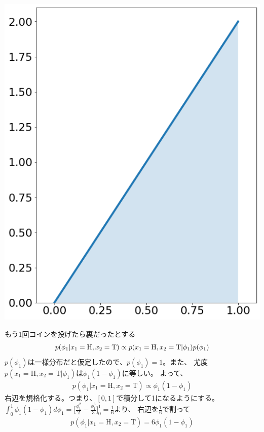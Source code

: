 \documentclass[aspectratio=169,unicode,dvipdfmx,14pt]{beamer}
\begin{document}
\begin{frame}
\begin{textblock*}{0.4\linewidth}
    \includegraphics[width=\linewidth]{beta_2_1.png}
\end{textblock*}
\end{frame}

\begin{frame}{もう1回コインを投げたら裏だったとする}
\vspace{-.3in}
\begin{align}
p(\phi_1 | x_1 = \mbox{H}, x_2 = \mbox{T}) 
\propto p(x_1 = \mbox{H}, x_2 = \mbox{T} | \phi_1) p(\phi_1)
\notag
\end{align}
$p(\phi_1)$は一様分布だと仮定したので、$p(\phi_1)=1$。また、
尤度$p(x_1 = \mbox{H}, x_2 = \mbox{T} | \phi_1)$は$\phi_1(1-\phi_1)$に等しい。
よって、
\begin{align}
p(\phi_1 | x_1 = \mbox{H}, x_2 = \mbox{T}) \propto \phi_1(1-\phi_1)
\end{align}
右辺を規格化する。つまり、$[0,1]$で積分して1になるようにする。
$\int_0^1 \phi_1(1-\phi_1) d\phi_1 = \Big[ \frac{\phi_1^2}{2} - \frac{\phi_1^3}{3} \Big]_0^1= \frac{1}{6}$より、
右辺を$\frac{1}{6}$で割って
\begin{align}
p(\phi_1 | x_1 = \mbox{H}, x_2 = \mbox{T}) = 6\phi_1(1-\phi_1)
\end{align}
\end{frame}
\end{document}

